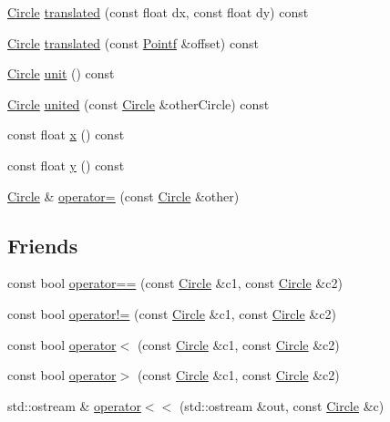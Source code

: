 \begin{DoxyCompactItemize}
\item 
\hyperlink{classprism_1_1_circle}{Circle} \hyperlink{classprism_1_1_circle_a255dcfc157fc52c83e0cbd9e54a65b89}{translated} (const float dx, const float dy) const 
\item 
\hyperlink{classprism_1_1_circle}{Circle} \hyperlink{classprism_1_1_circle_a7592ecc319feeaa2b446505b975b97c5}{translated} (const \hyperlink{classprism_1_1_pointf}{Pointf} \&offset) const 
\item 
\hyperlink{classprism_1_1_circle}{Circle} \hyperlink{classprism_1_1_circle_a9b5c163bfdb6d39fb890fa3a21a77a20}{unit} () const 
\item 
\hyperlink{classprism_1_1_circle}{Circle} \hyperlink{classprism_1_1_circle_a8e34ff5188e91cfe080264e106909f6e}{united} (const \hyperlink{classprism_1_1_circle}{Circle} \&other\+Circle) const 
\item 
const float \hyperlink{classprism_1_1_circle_ae1f729f8fa34605123628e67b230b6be}{x} () const 
\item 
const float \hyperlink{classprism_1_1_circle_a6edc045d912b0d278bd0673af028290e}{y} () const 
\item 
\hyperlink{classprism_1_1_circle}{Circle} \& \hyperlink{classprism_1_1_circle_a140275f8908e38d63bf2524b23887730}{operator=} (const \hyperlink{classprism_1_1_circle}{Circle} \&other)
\end{DoxyCompactItemize}
\subsection*{Friends}
\begin{DoxyCompactItemize}
\item 
const bool \hyperlink{classprism_1_1_circle_aea4bcef75428f13320f5c8148869d7ac}{operator==} (const \hyperlink{classprism_1_1_circle}{Circle} \&c1, const \hyperlink{classprism_1_1_circle}{Circle} \&c2)
\item 
const bool \hyperlink{classprism_1_1_circle_ac1093de6b8dac6c9df82db5b72148634}{operator!=} (const \hyperlink{classprism_1_1_circle}{Circle} \&c1, const \hyperlink{classprism_1_1_circle}{Circle} \&c2)
\item 
const bool \hyperlink{classprism_1_1_circle_a3aaa7d08426b0e4aa5f51f1839eb3bb1}{operator$<$} (const \hyperlink{classprism_1_1_circle}{Circle} \&c1, const \hyperlink{classprism_1_1_circle}{Circle} \&c2)
\item 
const bool \hyperlink{classprism_1_1_circle_a519af3a911c5ccd13d0c711d0adfef79}{operator$>$} (const \hyperlink{classprism_1_1_circle}{Circle} \&c1, const \hyperlink{classprism_1_1_circle}{Circle} \&c2)
\item 
std\+::ostream \& \hyperlink{classprism_1_1_circle_a4deb656103c2fc1ea9258fc37bfdcc6c}{operator$<$$<$} (std\+::ostream \&out, const \hyperlink{classprism_1_1_circle}{Circle} \&c)
\end{DoxyCompactItemize}



